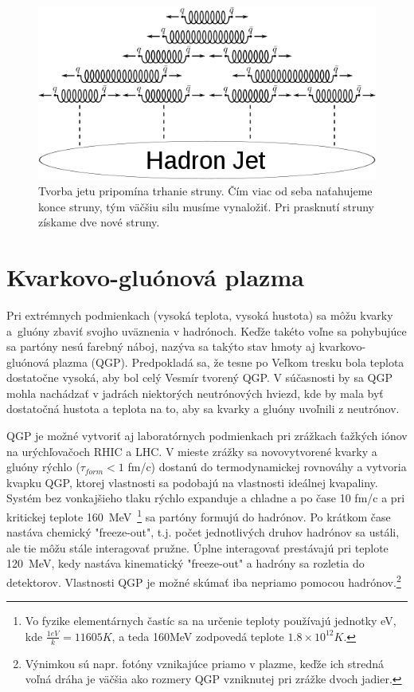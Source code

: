 \documentclass[thesismargins, thesislinespacing]{rnthesis}
\begin{document}
\begin{figure}[hbtp!]
	\begin{center}
	\includegraphics[scale=0.7]{./Obrazky_praca/jet.png}
	\caption{Tvorba jetu pripomína trhanie struny. Čím viac od seba naťahujeme konce struny, tým väčšiu silu musíme vynaložiť. Pri prasknutí struny získame dve nové struny.~\cite{8}}
	\label{jet}
	\end{center}
\end{figure}  

\section{Kvarkovo-gluónová plazma}

Pri extrémnych podmienkach (vysoká teplota, vysoká hustota) sa môžu kvarky a~gluó\-ny zbaviť svojho uväznenia v hadrónoch. Keďže takéto voľne sa pohybujúce sa partóny nesú farebný náboj, nazýva sa takýto stav hmoty aj kvarkovo-gluónová plazma (QGP). Predpokladá sa, že tesne po Veľkom tresku bola teplota dostatočne vysoká, aby bol celý Vesmír tvorený QGP. V súčasnosti by sa QGP mohla nachádzať v jadrách niektorých neutrónových hviezd, kde by mala byť dostatočná hustota a teplota na to, aby sa kvarky a gluóny uvoľnili z neutrónov.

QGP je možné vytvoriť aj laboratórnych podmienkach pri zrážkach ťažkých iónov na urýchľovačoch RHIC a LHC. V mieste zrážky sa novovytvorené kvarky a gluóny rýchlo ($\tau_{form}<1$ fm/c) dostanú do termodynamickej rovnováhy a vytvoria kvapku QGP, ktorej vlastnosti sa podobajú na vlastnosti ideálnej kvapaliny. Systém bez vonkajšieho tlaku rýchlo expanduje a chladne a po čase 10 fm/c a pri kritickej teplote 160~MeV~\footnote{Vo fyzike elementárnych častíc sa na určenie teploty používajú jednotky eV, kde $\frac{1eV}{k}= 11605K$, a teda 160MeV zodpovedá teplote $1.8\times10^{12}K$.} sa partóny formujú do hadrónov. Po krátkom čase nastáva chemický "freeze-out\-", t.j. počet jednotlivých druhov hadrónov sa ustáli, ale tie môžu stále interagovať pružne. Úplne interagovať prestávajú pri teplote 120~MeV, kedy nastáva kinematický "freeze-out" \-a hadróny sa rozletia do detektorov. Vlastnosti QGP je možné skúmať iba nepriamo pomocou hadrónov.\footnote{Výnimkou sú napr. fotóny vznikajúce priamo v plazme, keďže ich stredná voľná dráha je väčšia ako rozmery QGP vzniknutej pri zrážke dvoch jadier.}  
\end{document}
